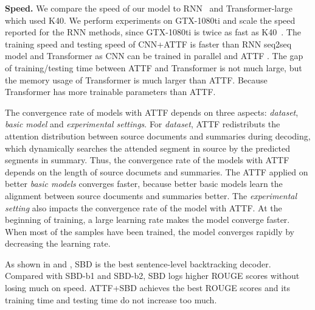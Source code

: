 

\textbf{Speed.} 
We compare the speed of our model to RNN~\citep{SeeLM17} and Transformer-large~\citep{Attn17}
which used K40. 
We perform experiments on GTX-1080ti and scale the speed 
reported for the RNN methods,
since GTX-1080ti is twice as fast as K40~\citep{gehring2017convs2s}.
The training speed and testing speed of CNN+ATTF 
is faster than RNN seq2seq model and Transformer
as CNN can be trained in parallel and ATTF .
The gap of training/testing time between ATTF and Transformer is not much large,
but the memory usage of Transformer is much larger than ATTF.
Because Transformer has more trainable parameters than ATTF.

The convergence rate of models with ATTF depends on three aspects:
{\em dataset}, {\em basic model} and {\em experimental settings}.
For {\em dataset}, ATTF redistributs the attention distribution between source documents and summaries during decoding,
which dynamically searches the attended segment in source by the predicted segments in summary.
Thus, the convergence rate of the models with ATTF depends on the length of source documets and summaries.
The ATTF applied on better {\em basic models} converges faster,
because better basic models learn the alignment between source documents and summaries better.
The {\em experimental setting} also impacts the convergence rate of the model with ATTF.
At the beginning of training, a large learning rate makes the model converge faster. 
When most of the samples have been trained, 
the model converges rapidly by decreasing the learning rate.

As shown in  and , 
SBD is the best sentence-level backtracking decoder.
Compared with SBD-b1 and SBD-b2,
SBD logs higher ROUGE scores without losing much on speed. 
ATTF+SBD achieves the best ROUGE scores 
and its training time and testing time do not increase too much.

